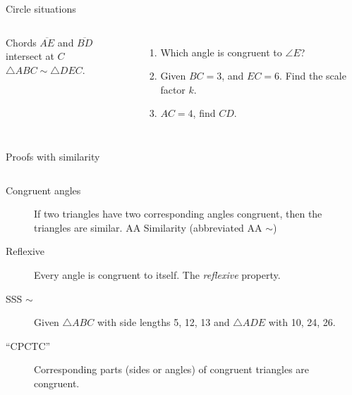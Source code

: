 \documentclass[onlytextwidth, aspectratio=169]{beamer}
\begin{document}
\begin{frame}{Circle situations}
  \begin{columns}
    Chords $\overline{AE}$ and $\overline{BD}$ intersect at $C$ \\[0.5cm]
    $\triangle ABC \sim \triangle DEC$. \vspace{1cm}
    \begin{enumerate}
      \item Which angle is congruent to $\angle E$? 
      \item Given $BC=3$, and $EC=6$. Find the scale factor $k$.
      \item $AC=4$, find $CD$. \vspace{1cm}
    \end{enumerate}
    \begin{flushright}
    \end{flushright}
  \end{columns}
\end{frame}

\begin{frame}{Proofs with similarity }
  \begin{columns}
      \begin{description}
        \item[Congruent angles] If two triangles have two corresponding angles congruent, then the triangles are similar. AA Similarity (abbreviated AA $\sim$)
        \item[Reflexive] Every angle is congruent to itself. The \emph{reflexive} property.
        \item[SSS $\sim$] Given $\triangle ABC$ with side lengths 5, 12, 13 and $\triangle ADE$ with 10, 24, 26.
        \item[``CPCTC''] Corresponding parts (sides or angles) of congruent triangles are congruent.
      \end{description}
    \begin{flushright}
    \end{flushright}
  \end{columns}
\end{frame}
\end{document}
